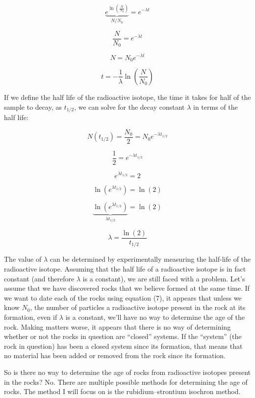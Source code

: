 \documentclass[11pt]{article}
\begin{document}
\[\underbrace {{e^{\ln \left( {\frac{N}{{{N_0}}}} \right)}}}_{N/{N_0}} = {e^{ - \lambda t}}\]

\[
\frac{N}{N_0}=e^{-\lambda t}
\]

\begin{equation}
N = N_0 e^{-\lambda t}
\end{equation}

\begin{equation}
t = -\frac{1}{\lambda}\ln\!\left(\frac{N}{N_0}\right)
\end{equation}

If we define the half life of the radioactive isotope, the time it takes for half of the sample to decay, as $t_{1/2}$, we can solve for the decay constant $\lambda$ in terms of the half life:

\[
N(t_{1/2}) = \frac{N_0}{2} = N_0 e^{-\lambda t_{1/2}}
\]

\[
\frac{1}{2}=e^{-\lambda t_{1/2}}
\]

\[
e^{\lambda t_{1/2}}=2
\]

\[
\ln\!\left(e^{\lambda t_{1/2}}\right)=\ln(2)
\]

\[\underbrace {\ln \left( {{e^{\lambda {t_{1/2}}}}} \right)}_{\lambda {t_{1/2}}} = \ln \left( 2 \right)\]

\begin{equation}
\boxed{\lambda = \frac{\ln(2)}{t_{1/2}}}
\end{equation}

The value of $\lambda$ can be determined by experimentally measuring the half-life of the radioactive isotope. Assuming that the half life of a radioactive isotope is in fact constant (and therefore $\lambda$ is a constant), we are still faced with a problem. Let’s assume that we have discovered rocks that we believe formed at the same time. If we want to date each of the rocks using equation (7), it appears that unless we know $N_0$, the number of particles a radioactive isotope present in the rock at its formation, even if $\lambda$ is a constant, we’ll have no way to determine the age of the rock. Making matters worse, it appears that there is no way of determining whether or not the rocks in question are ``closed'' systems. If the ``system'' (the rock in question) has been a closed system since its formation, that means that no material has been added or removed from the rock since its formation.

So is there no way to determine the age of rocks from radioactive isotopes present in the rocks? No. There are multiple possible methods for determining the age of rocks. The method I will focus on is the rubidium--strontium isochron method.
\end{document}
